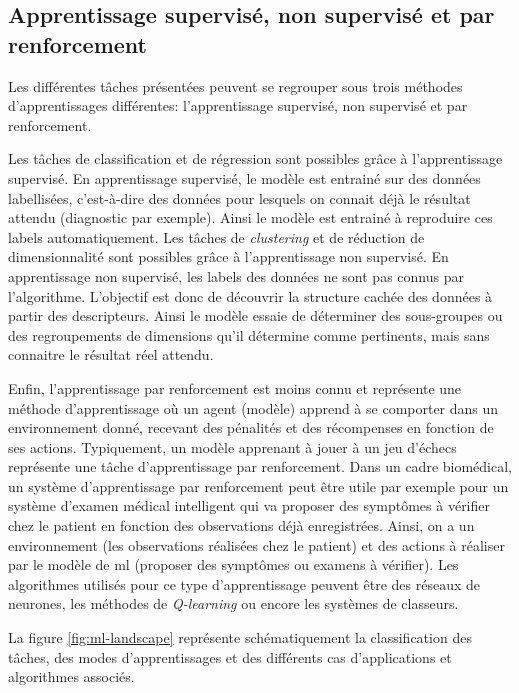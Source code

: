 \subsection{Apprentissage supervisé, non supervisé et par renforcement}
Les différentes tâches présentées peuvent se regrouper sous trois méthodes d'apprentissages différentes: l'apprentissage supervisé, non supervisé et par renforcement.

Les tâches de classification et de régression sont possibles grâce à l'apprentissage supervisé. En apprentissage supervisé, le modèle est entrainé sur des données labellisées, c'est-à-dire des données pour lesquels on connait déjà le résultat attendu (diagnostic par exemple). Ainsi le modèle est entrainé à reproduire ces labels automatiquement.
Les tâches de \textit{clustering} et de réduction de dimensionnalité sont possibles grâce à l'apprentissage non supervisé. En apprentissage non supervisé, les labels des données ne sont pas connus par l'algorithme. L'objectif est donc de découvrir la structure cachée des données à partir des descripteurs. Ainsi le modèle essaie de déterminer des sous-groupes ou des regroupements de dimensions qu'il détermine comme pertinents, mais sans connaitre le résultat réel attendu.

Enfin, l'apprentissage par renforcement est moins connu et représente une méthode d'apprentissage où un agent (modèle) apprend à se comporter dans un environnement donné, recevant des pénalités et des récompenses en fonction de ses actions. Typiquement, un modèle apprenant à jouer à un jeu d'échecs représente une tâche d'apprentissage par renforcement. Dans un cadre biomédical, un système d'apprentissage par renforcement peut être utile par exemple pour un système d'examen médical intelligent qui va proposer des symptômes à vérifier chez le patient en fonction des observations déjà enregistrées. Ainsi, on a un environnement (les observations réalisées chez le patient) et des actions à réaliser par le modèle de \gls{ml} (proposer des symptômes ou examens à vérifier). Les algorithmes utilisés pour ce type d'apprentissage peuvent être des réseaux de neurones, les méthodes de \textit{Q-learning} ou encore les systèmes de classeurs.

La figure \ref{fig:ml-landscape} représente schématiquement la classification des tâches, des modes d'apprentissages et des différents cas d'applications et algorithmes associés.

